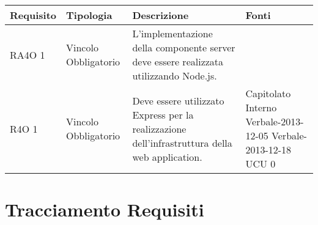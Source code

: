       \begin{center}
      \bgroup
      \def\arraystretch{1.8}
      \begin{longtable}{ | l | p{2cm} | p{5cm} | p{1.7cm} |}
    
      \cellcolor[gray]{0.9} \textbf{Requisito} & \cellcolor[gray]{0.9} \textbf{Tipologia} 
      & \cellcolor[gray]{0.9} \textbf{Descrizione} & \cellcolor[gray]{0.9} \textbf{Fonti} \\ \hline
      
        RA4O 1 & Vincolo \newline  Obbligatorio  & L’implementazione della componente server deve essere realizzata utilizzando Node.js. &  \\ \hline      
        R4O 1 & Vincolo \newline  Obbligatorio  & Deve essere utilizzato Express per la realizzazione dell’infrastruttura della web application. &  Capitolato \newline  Interno \newline  Verbale-2013-12-05 \newline  Verbale-2013-12-18 \newline  UCU 0 \newline  \\ \hline
      \end{longtable}
      \egroup
      \end{center}  
\clearpage
\section{Tracciamento Requisiti}
